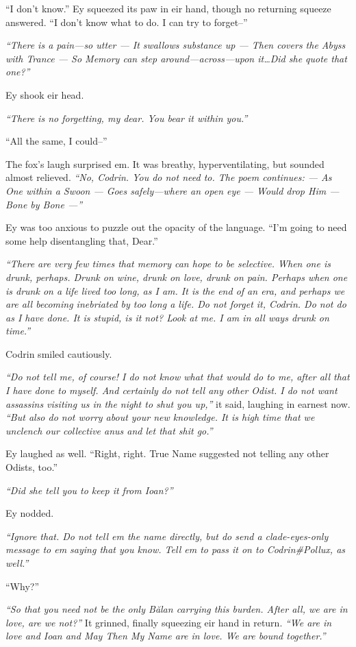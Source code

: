 ``I don't know.'' Ey squeezed its paw in eir hand, though no returning squeeze answered. ``I don't know what to do. I can try to forget--''

\emph{``There is a pain—so utter — It swallows substance up — Then covers the Abyss with Trance — So Memory can step around—across—upon it\ldots Did she quote that one?''}

Ey shook eir head.

\emph{``There is no forgetting, my dear. You bear it within you.''}

``All the same, I could--''

The fox's laugh surprised em. It was breathy, hyperventilating, but sounded almost relieved. \emph{``No, Codrin. You do not need to. The poem continues: — As One within a Swoon — Goes safely—where an open eye — Would drop Him — Bone by Bone —''}

Ey was too anxious to puzzle out the opacity of the language. ``I'm going to need some help disentangling that, Dear.''

\emph{``There are very few times that memory can hope to be selective. When one is drunk, perhaps. Drunk on wine, drunk on love, drunk on pain. Perhaps when one is drunk on a life lived too long, as I am. It is the end of an era, and perhaps we are all becoming inebriated by too long a life. Do not forget it, Codrin. Do not do as I have done. It is stupid, is it not? Look at me. I am in all ways drunk on time.''}

Codrin smiled cautiously.

\emph{``Do not tell me, of course! I do not know what that would do to me, after all that I have done to myself. And certainly do not tell any other Odist. I do not want assassins visiting us in the night to shut you up,''} it said, laughing in earnest now. \emph{``But also do not worry about your new knowledge. It is high time that we unclench our collective anus and let that shit go.''}

Ey laughed as well. ``Right, right. True Name suggested not telling any other Odists, too.''

\emph{``Did she tell you to keep it from Ioan?''}

Ey nodded.

\emph{``Ignore that. Do not tell em the name directly, but do send a clade-eyes-only message to em saying that you know. Tell em to pass it on to Codrin\#Pollux, as well.''}

``Why?''

\emph{``So that you need not be the only Bălan carrying this burden. After all, we are in love, are we not?''} It grinned, finally squeezing eir hand in return. \emph{``We are in love and Ioan and May Then My Name are in love. We are bound together.''}

